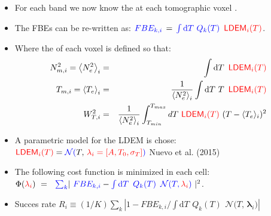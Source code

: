 \documentclass{beamer}
\begin{document}

\begin{frame}%
\footnotesize
\begin{itemize}
\item
For each band  we now know the  at each tomographic voxel .
\salto
\item
The FBEs can be re-written as:
$\textcolor{blue}{FBE_{k,i} } \, = \, \textcolor{blue}{\int \mathrm{d}T \  Q_k(T) \ \, \textcolor{red}{{\sf LDEM}_i(T)} }$.
\salto
\item
Where the  of each voxel  is defined so that:
\begin{eqnarray}
N_{m,i}^2 = \left< N_e^2\right>_i &=& \int \mathrm{d} T \ \, \rojo{{\sf LDEM}_i(T)}\nonumber\\
T_{m,i} = \left<T_e\right>_i  &=& \frac{1}{\left< N_e^2\right>_i } \int \mathrm{d}T\ T \ \, \rojo{{\sf LDEM}_i(T)}\nonumber \\
 W_{T,i}^2 &=&  \frac{1}{\left< N_e^2\right>_i} \int_{T_{min}}^{T_{max}} dT\ \rojo{{\sf LDEM}_i(T)}\ (T - \langle T_e \rangle_i)^2 \nonumber
\end{eqnarray}
\item A parametric model for the LDEM is chose:\ 
$\textcolor{red}{{\sf LDEM}_i(T)}=\textcolor{blue}{\mathcal{N}(}T,\,\textcolor{red}{\mathbf{\lambda}_i=[A,T_0,\sigma_T]}\textcolor{blue}{)}$ Nuevo et al. (2015)
\salto
\item
The following cost function is minimized in each cell: \mediosalto
\hskip 3cm
$
\Phi(\rojo{{\mathbf{\lambda}}_i}) \ = \ 
\ \azul{\sum_{k}}| \ \azul{ FBE_{k,i} }-
\azul{\int \mathrm{d}T \ \, Q_k(T)\ \, \mathcal{N}(T,}\,\rojo{\mathbf{\lambda}_i}\azul{)} \ 
|^2 
$.
\item Succes rate 
$
R_i \equiv (1/K) \sum_{k} | 1 - { FBE_{k,i} } / {\int \mathrm{d}T \ \, Q_k(T)\ \, \mathcal{N}(T,}\,{\mathbf{\lambda}_i}{)} |
$
\end{itemize}
\end{frame}
\end{document}
